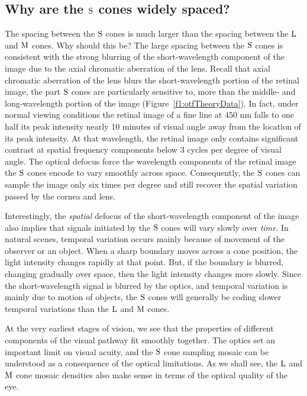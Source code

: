 \subsection*{Why are the $\mbox{S}$ cones widely spaced?}
The spacing between the $\mbox{S}$ cones is 
much larger than the spacing between
the $\mbox{L}$ and $\mbox{M}$ cones.
Why should this be?
The large spacing between the $\mbox{S}$ cones
is consistent with the strong blurring
of the short-wavelength component of the
image due to the axial chromatic aberration of the lens.
Recall that axial chromatic aberration
of the lens blurs the short-wavelength portion of
the retinal image, the part $\mbox{S}$ cones are particularly
sensitive to, more than the middle- and long-wavelength portion of
the image (Figure~\ref{f1:otfTheoryData}).
In fact, under normal viewing conditions
the retinal image of a fine line at 450 nm 
falls to one half its peak intensity nearly 10 minutes of visual
angle away from the location of its peak intensity.
At that wavelength, the retinal image only contains 
significant contrast at spatial frequency components below 
3 cycles per degree of visual angle.
The optical defocus
force the wavelength components of the retinal image
the $\mbox{S}$ cones encode to vary smoothly across space.
Consequently, the $\mbox{S}$ cones can sample the image
only six times per degree
and still recover the spatial variation passed
by the cornea and lens.

Interestingly,
the {\em spatial} defocus of the short-wavelength component of the image
also implies that signals initiated by the $\mbox{S}$ cones will
vary slowly over {\em time}.
In natural scenes, temporal variation occurs mainly
because of movement of the observer or an object.
When a sharp boundary moves across a cone position,
the light intensity changes rapidly at that point.
But, if the boundary is blurred, changing gradually over space,
then the light intensity changes more slowly.
Since the short-wavelength signal is blurred by the optics,
and temporal variation is mainly due to motion of objects,
the $\mbox{S}$ cones will generally be coding
slower temporal variations than the $\mbox{L}$ and $\mbox{M}$ cones.

At the very earliest stages of vision, we see that the
properties of different components of the visual pathway
fit smoothly together.
The optics set an important limit on visual acuity,
and the $\mbox{S}$ cone sampling mosaic
can be understood as a consequence
of the optical limitations.
As we shall see,
the $\mbox{L}$ and $\mbox{M}$ cone mosaic densities
also make sense in terms of the optical quality of the eye.

